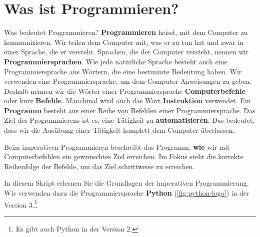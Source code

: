 
\toggletrue{image}
\toggletrue{imagehover}


\chapter{Was ist Programmieren?}
\label{ch:was-ist-programmieren}

Was bedeutet Programmieren? \textbf{Programmieren} heisst, mit dem Computer zu kommunizieren.
Wir teilen dem Computer mit, was er zu tun hat und zwar in einer Sprache, die er versteht.
Sprachen, die der Computer versteht, nennen wir \textbf{Programmiersprachen}.
Wie jede natürliche Sprache besteht auch eine Programmiersprache aus Wörtern, die eine bestimmte Bedeutung haben.
Wir verwenden eine Programmiersprache, um dem Computer Anweisungen zu geben.
Deshalb nennen wir die Wörter einer Programmiersprache \textbf{Computerbefehle} oder kurz \textbf{Befehle}.
Manchmal wird auch das Wort \textbf{Instruktion} verwendet. Ein \textbf{Programm} besteht aus einer Reihe von Befehlen einer Programmiersprache.
Das Ziel des Programmierens ist es, eine Tätigkeit zu \textbf{automatisieren}.
Das bedeutet, dass wir die Ausübung einer Tätigkeit komplett dem Computer überlassen. \cite{einfach-informatik-programmieren}

\begin{definition}
    Beim imperativen Programmieren beschreibt das Programm, \textbf{wie} wir mit Computerbefehlen ein gewünschtes Ziel erreichen.
    Im Fokus steht die korrekte Reihenfolge der Befehle, um das Ziel schrittweise zu erreichen.
\end{definition}

In diesem Skript erlernen Sie die Grundlagen der imperativen Programmierung.
Wir verwenden dazu die Programmiersprache \textbf{Python} (\autoref{fig:python-logo}) in der Version 3.\footnote{Es gibt auch Python in der Version 2.}

